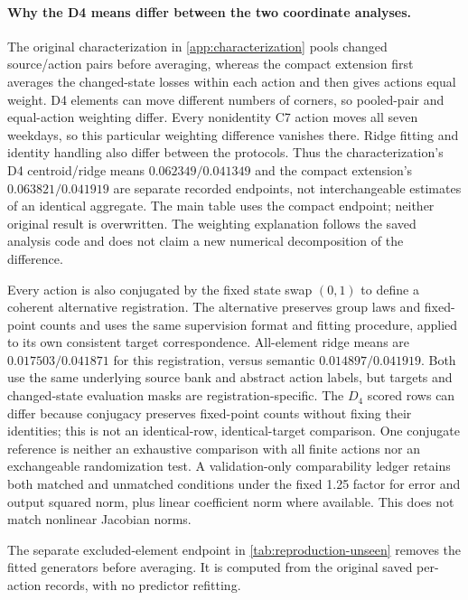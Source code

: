 \paragraph{Why the D4 means differ between the two coordinate analyses.}
\label{app:aggregation-contract}
The original characterization in \cref{app:characterization} pools changed source/action pairs before averaging, whereas the compact extension first averages the changed-state losses within each action and then gives actions equal weight. D4 elements can move different numbers of corners, so pooled-pair and equal-action weighting differ. Every nonidentity C7 action moves all seven weekdays, so this particular weighting difference vanishes there. Ridge fitting and identity handling also differ between the protocols. Thus the characterization's D4 centroid/ridge means $0.062349/0.041349$ and the compact extension's $0.063821/0.041919$ are separate recorded endpoints, not interchangeable estimates of an identical aggregate. The main table uses the compact endpoint; neither original result is overwritten. The weighting explanation follows the saved analysis code and does not claim a new numerical decomposition of the difference.

Every action is also conjugated by the fixed state swap $(0,1)$ to define a coherent alternative registration. The alternative preserves group laws and fixed-point counts and uses the same supervision format and fitting procedure, applied to its own consistent target correspondence. All-element ridge means are $0.017503/0.041871$ for this registration, versus semantic $0.014897/0.041919$. Both use the same underlying source bank and abstract action labels, but targets and changed-state evaluation masks are registration-specific. The $D_4$ scored rows can differ because conjugacy preserves fixed-point counts without fixing their identities; this is not an identical-row, identical-target comparison. One conjugate reference is neither an exhaustive comparison with all finite actions nor an exchangeable randomization test. A validation-only comparability ledger retains both matched and unmatched conditions under the fixed 1.25 factor for error and output squared norm, plus linear coefficient norm where available. This does not match nonlinear Jacobian norms.


The separate excluded-element endpoint in \cref{tab:reproduction-unseen} removes the fitted generators before averaging. It is computed from the original saved per-action records, with no predictor refitting.

